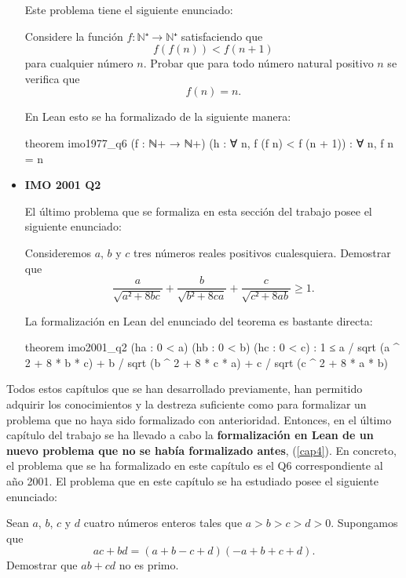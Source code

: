 \begin{itemize}
  Este problema tiene el siguiente enunciado:

  Considere la función
  \(f:ℕ⁺ → ℕ⁺\) satisfaciendo que
  \[f(f(n)) < f(n+1)\]
  para cualquier número \(n\). Probar que para todo número
  natural positivo \(n\) se verifica que
  \[f(n) = n.\]

  En Lean esto se ha formalizado de la siguiente manera:
  \begin{leancode}
  theorem imo1977_q6
    (f : ℕ+ → ℕ+)
    (h : ∀ n, f (f n) < f (n + 1))
    : ∀ n, f n = n
  \end{leancode}

\item \textbf{IMO 2001 Q2}

  El último problema que se formaliza en esta sección del trabajo posee el
  siguiente enunciado:

  Consideremos \(a\), \(b\) y \(c\) tres números reales positivos
  cualesquiera. Demostrar que
  \begin{equation*}
    \frac{a}{\sqrt{a²+8bc}} +
    \frac{b}{\sqrt{b²+8ca}} +
    \frac{c}{\sqrt{c²+8ab}} ≥ 1.
  \end{equation*}

  La formalización en Lean del enunciado del teorema es bastante directa:

  \begin{leancode}
  theorem imo2001_q2
    (ha : 0 < a)
    (hb : 0 < b)
    (hc : 0 < c)
    : 1 ≤ a / sqrt (a ^ 2 + 8 * b * c) +
          b / sqrt (b ^ 2 + 8 * c * a) +
          c / sqrt (c ^ 2 + 8 * a * b)
  \end{leancode}

\end{itemize}

Todos estos capítulos que se han desarrollado previamente, han permitido
adquirir los conocimientos y la destreza suficiente como para formalizar un
problema que no haya sido formalizado con anterioridad. Entonces, en el último
capítulo del trabajo se ha llevado a cabo la \textbf{
formalización en Lean de un nuevo problema que no se había formalizado antes},
(\ref{cap4}). En concreto, el problema que se ha formalizado en este capítulo es
el Q6 correspondiente al año 2001. El problema que en este capítulo se ha
estudiado posee el siguiente enunciado:

Sean \(a\), \(b\), \(c\) y \(d\) cuatro números enteros tales que
\(a > b > c > d > 0\). Supongamos que
\begin{equation*}
  ac+bd = (a+b-c+d)(-a+b+c+d).
\end{equation*}
Demostrar que \(ab+cd\) no es primo.

